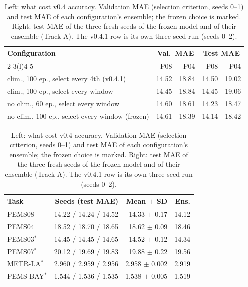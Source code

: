 \begin{table}[t]
\caption{Left: what cost v0.4 accuracy. Validation MAE (selection criterion, seeds 0--1) and test MAE of each configuration's ensemble; the frozen choice is marked. Right: test MAE of the three fresh seeds of the frozen model and of their ensemble (Track A). The v0.4.1 row is its own three-seed run (seeds 0--2).}
\label{tab:abl}
\scriptsize
\setlength{\tabcolsep}{2.5pt}
\begin{tabular}{@{}lrrrr@{}}
\toprule
Configuration & \multicolumn{2}{c}{Val.\ MAE} & \multicolumn{2}{c}{Test MAE} \\
\cmidrule(lr){2-3}\cmidrule(l){4-5}
 & P08 & P04 & P08 & P04 \\
\midrule
clim., 100 ep., select every 4th (v0.4.1) & 14.52 & 18.84 & 14.50 & 19.02 \\
clim., 100 ep., select every window & 14.45 & 18.84 & 14.45 & 19.06 \\
no clim., 60 ep., select every window & 14.60 & 18.61 & 14.23 & 18.47 \\
no clim., 100 ep., select every window (frozen) & 14.61 & 18.39 & 14.14 & 18.42 \\
\bottomrule
\end{tabular}
\vspace{4pt}
\begin{tabular}{@{}lrrr@{}}
\toprule
Task & Seeds (test MAE) & Mean $\pm$ SD & Ens. \\
\midrule
PEMS08 & 14.22 / 14.24 / 14.52 & 14.33 $\pm$ 0.17 & 14.12 \\
PEMS04 & 18.52 / 18.70 / 18.65 & 18.62 $\pm$ 0.09 & 18.46 \\
PEMS03$^\ast$ & 14.45 / 14.45 / 14.65 & 14.52 $\pm$ 0.12 & 14.34 \\
PEMS07$^\ast$ & 20.12 / 19.69 / 19.83 & 19.88 $\pm$ 0.22 & 19.56 \\
METR-LA$^\ast$ & 2.960 / 2.959 / 2.956 & 2.958 $\pm$ 0.002 & 2.919 \\
PEMS-BAY$^\ast$ & 1.544 / 1.536 / 1.535 & 1.538 $\pm$ 0.005 & 1.519 \\
\bottomrule
\end{tabular}
\end{table}